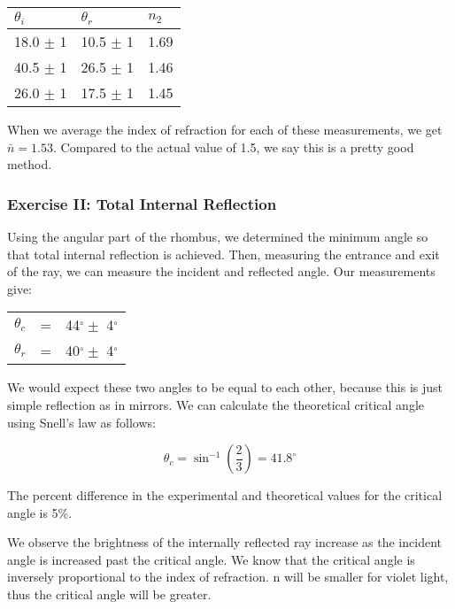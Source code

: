 \documentclass[12pt]{article}
\begin{document}
\begin{center}
  \begin{tabular}{|l|l|l|}
    \hline
    $\theta_i$ & $\theta_r$ & $n_2$ \\
    \hline
    18.0 $\pm$ 1 & 10.5 $\pm$ 1 & 1.69 \\
    40.5 $\pm$ 1 & 26.5 $\pm$ 1 & 1.46 \\
    26.0 $\pm$ 1 & 17.5 $\pm$ 1 & 1.45 \\
    \hline
  \end{tabular}
\end{center}

When we average the index of refraction for each of these
measurements, we get $\bar{n} = 1.53$. Compared to the actual value of
1.5, we say this is a pretty good method.

\subsubsection*{Exercise II: Total Internal Reflection}
Using the angular part of the rhombus, we determined the minimum angle
so that total internal reflection is achieved. Then, measuring the
entrance and exit of the ray, we can measure the incident and
reflected angle. Our measurements give: 

\begin{center}
  \begin{tabular}{l l l}
    $\theta_c$ &= & 44$^{\circ} \pm$ 4$^{\circ}$ \\
    $\theta_r$ &= & 40$^{\circ} \pm$ 4$^{\circ}$ \\
  \end{tabular}
\end{center}


We would expect these two angles to be equal to each other, because
this is just simple reflection as in mirrors. We can calculate the
theoretical critical angle using Snell's law as follows:

\[\theta_c = \sin^{-1}\left(\frac{2}{3}\right) = 41.8^{\circ}\]

The percent difference in the experimental and theoretical values for
the critical angle is 5\%. 

We observe the brightness of the internally reflected ray increase as
the incident angle is increased past the critical angle. We know that
the critical angle is inversely proportional to the index of
refraction. n will be smaller for violet light, thus the critical
angle will be greater.
\end{document}
